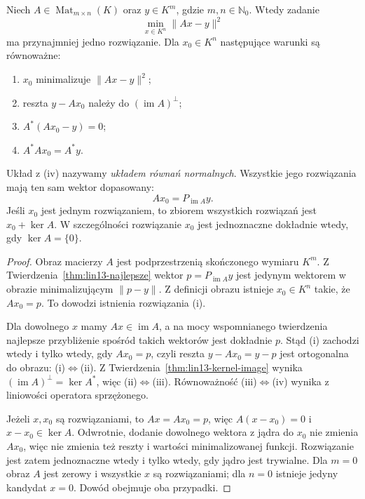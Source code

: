 \begin{twierdzenie}
\label{thm:lin13-normal-equations}
Niech \(A\in\operatorname{Mat}_{m\times n}(K)\)
oraz \(y\in K^m\), gdzie
\(m,n\in\mathbb N_0\).
Wtedy zadanie
\[
 \min_{x\in K^n}\|Ax-y\|^2
\]
ma przynajmniej jedno rozwiązanie.
Dla \(x_0\in K^n\)
następujące warunki są równoważne:
\begin{enumerate}[label=(\roman*)]
 \item \(x_0\) minimalizuje
       \(\|Ax-y\|^2\);
 \item reszta \(y-Ax_0\)
       należy do \((\operatorname{im}A)^\perp\);
 \item \(A^*(Ax_0-y)=0\);
 \item \(A^*Ax_0=A^*y\).
\end{enumerate}
Układ z (iv) nazywamy
\emph{układem równań normalnych}.
Wszystkie jego rozwiązania
mają ten sam wektor dopasowany:
\[
 Ax_0=P_{\operatorname{im}A}y.
\]
Jeśli \(x_0\) jest jednym rozwiązaniem,
to zbiorem wszystkich rozwiązań jest
\(x_0+\ker A\). W szczególności
rozwiązanie \(x_0\) jest jednoznaczne
dokładnie wtedy, gdy \(\ker A=\{0\}\).
\end{twierdzenie}
\begin{proof}
Obraz macierzy \(A\)
jest podprzestrzenią
skończonego wymiaru \(K^m\).
Z
Twierdzenia~\ref{thm:lin13-najlepsze}
wektor \(p=P_{\operatorname{im}A}y\)
jest jedynym wektorem w obrazie
minimalizującym \(\|p-y\|\).
Z definicji obrazu istnieje
\(x_0\in K^n\) takie, że
\(Ax_0=p\). To dowodzi
istnienia rozwiązania (i).

Dla dowolnego \(x\) mamy
\(Ax\in\operatorname{im}A\),
a na mocy wspomnianego
twierdzenia najlepsze
przybliżenie spośród takich
wektorów jest dokładnie \(p\).
Stąd (i) zachodzi wtedy i
tylko wtedy, gdy \(Ax_0=p\),
czyli reszta
\(y-Ax_0=y-p\)
jest ortogonalna do obrazu:
(i)\(\iff\)(ii).
Z
Twierdzenia~\ref{thm:lin13-kernel-image}
wynika
\((\operatorname{im}A)^\perp=\ker A^*\),
więc (ii)\(\iff\)(iii).
Równoważność (iii)\(\iff\)(iv)
wynika z liniowości operatora
sprzężonego.

Jeżeli \(x,x_0\) są rozwiązaniami,
to \(Ax=Ax_0=p\), więc
\(A(x-x_0)=0\) i
\(x-x_0\in\ker A\).
Odwrotnie, dodanie dowolnego
wektora z jądra do \(x_0\)
nie zmienia \(Ax_0\), więc
nie zmienia też reszty i
wartości minimalizowanej funkcji.
Rozwiązanie jest zatem
jednoznaczne wtedy i tylko wtedy,
gdy jądro jest trywialne.
Dla \(m=0\) obraz \(A\)
jest zerowy i wszystkie \(x\)
są rozwiązaniami; dla \(n=0\)
istnieje jedyny kandydat \(x=0\).
Dowód obejmuje oba przypadki.
\end{proof}

